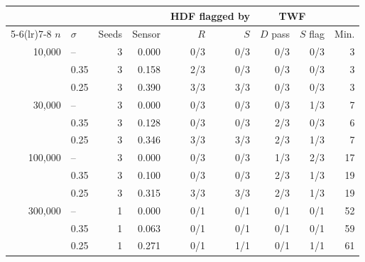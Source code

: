 \begin{tabular}{@{}rlrrrrrrr@{}}
\toprule
& & & & \multicolumn{2}{c}{HDF flagged by} & \multicolumn{2}{c}{TWF} & \\
\cmidrule(lr){5-6}\cmidrule(lr){7-8}
$n$ & $\sigma$ & Seeds & Sensor & $R$ & $S$ & $D$ pass & $S$ flag & Min. \\
\midrule
10{,}000 & -- & 3 & 0.000 & 0/3 & 0/3 & 0/3 & 0/3 & 3 \\
 & 0.35 & 3 & 0.158 & 2/3 & 0/3 & 0/3 & 0/3 & 3 \\
 & 0.25 & 3 & 0.390 & 3/3 & 3/3 & 0/3 & 0/3 & 3 \\
30{,}000 & -- & 3 & 0.000 & 0/3 & 0/3 & 0/3 & 1/3 & 7 \\
 & 0.35 & 3 & 0.128 & 0/3 & 0/3 & 2/3 & 0/3 & 6 \\
 & 0.25 & 3 & 0.346 & 3/3 & 3/3 & 2/3 & 1/3 & 7 \\
100{,}000 & -- & 3 & 0.000 & 0/3 & 0/3 & 1/3 & 2/3 & 17 \\
 & 0.35 & 3 & 0.100 & 0/3 & 0/3 & 2/3 & 1/3 & 19 \\
 & 0.25 & 3 & 0.315 & 3/3 & 3/3 & 2/3 & 1/3 & 19 \\
300{,}000 & -- & 1 & 0.000 & 0/1 & 0/1 & 0/1 & 0/1 & 52 \\
 & 0.35 & 1 & 0.063 & 0/1 & 0/1 & 0/1 & 0/1 & 59 \\
 & 0.25 & 1 & 0.271 & 0/1 & 1/1 & 0/1 & 1/1 & 61 \\
\bottomrule
\end{tabular}
